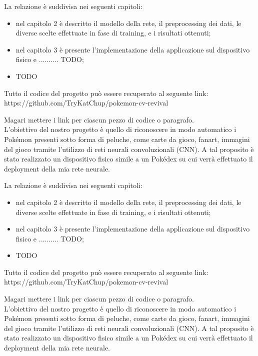La relazione è suddivisa nei seguenti capitoli:
\begin{itemize}
  \item nel capitolo 2 è descritto il modello della rete, il preprocessing dei dati, le diverse scelte effettuate in fase di training, e i risultati ottenuti;
  \item nel capitolo 3 è presente l'implementazione della applicazione sul dispositivo fisico e .......... TODO;
  \item TODO
\end{itemize}

Tutto il codice del progetto può essere recuperato al seguente link: 
\\
https://github.com/TryKatChup/pokemon-cv-revival

Magari mettere i link per ciascun pezzo di codice o paragrafo.
\\
L'obiettivo del nostro progetto è quello di riconoscere in modo automatico i Pokémon presenti sotto forma di peluche, come carte da gioco, fanart, immagini del gioco tramite l'utilizzo di reti neurali convoluzionali (CNN). A tal proposito è stato realizzato un dispositivo fisico simile
a un Pokédex su cui verrà effettuato il deployment della mia rete neurale.

La relazione è suddivisa nei seguenti capitoli:
\begin{itemize}
  \item nel capitolo 2 è descritto il modello della rete, il preprocessing dei dati, le diverse scelte effettuate in fase di training, e i risultati ottenuti;
  \item nel capitolo 3 è presente l'implementazione della applicazione sul dispositivo fisico e .......... TODO;
  \item TODO
\end{itemize}

Tutto il codice del progetto può essere recuperato al seguente link: 
\\
https://github.com/TryKatChup/pokemon-cv-revival

Magari mettere i link per ciascun pezzo di codice o paragrafo.
\\
L'obiettivo del nostro progetto è quello di riconoscere in modo automatico i Pokémon presenti sotto forma di peluche, come carte da gioco, fanart, immagini del gioco tramite l'utilizzo di reti neurali convoluzionali (CNN). A tal proposito è stato realizzato un dispositivo fisico simile
a un Pokédex su cui verrà effettuato il deployment della mia rete neurale.

